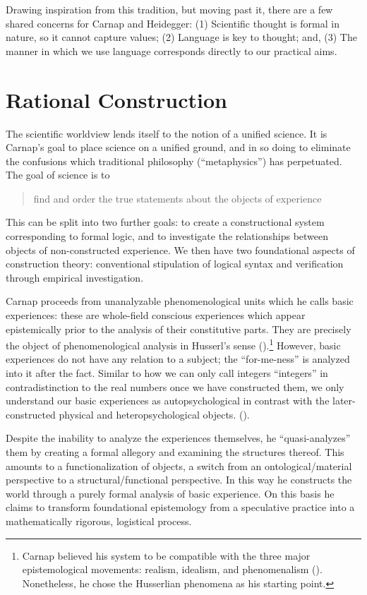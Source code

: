 \documentclass[leqno, 12pt]{turabian-researchpaper}
\begin{document}
	Drawing inspiration from this tradition, but moving past it, there are a few shared
	concerns for Carnap and Heidegger: (1) Scientific thought is formal in nature,
	so it cannot capture values; (2) Language is key to thought; and, (3) The
	manner in which we use language corresponds directly to our practical aims.

	\section{Rational Construction}

	The scientific worldview lends itself to the notion of a unified science. It
	is Carnap's goal to place science on a unified ground, and in so doing to eliminate
	the confusions which traditional philosophy (\enquote{metaphysics}) has
	perpetuated. The goal of science is to \blockquote[{}]{find and order the true statements about the objects of experience}.
	This can be split into two further goals: to create a constructional system corresponding
	to formal logic, and to investigate the relationships between objects of non-constructed
	experience. We then have two foundational aspects of construction theory:
	conventional stipulation of logical syntax and verification through empirical
	investigation.

	Carnap proceeds from unanalyzable phenomenological units which he calls basic
	experiences: these are whole-field conscious experiences which appear epistemically
	prior to the analysis of their constitutive parts. They are precisely the
	object of phenomenological analysis in Husserl's sense ().\footnote{Carnap
	believed his system to be compatible with the three major epistemological
	movements: realism, idealism, and phenomenalism ().
	Nonetheless, he chose the Husserlian phenomena as his starting point.} However,
	basic experiences do not have any relation to a subject; the \enquote{for-me-ness}
	is analyzed into it after the fact. Similar to how we can only call integers \enquote{integers}
	in contradistinction to the real numbers once we have constructed them, we only
	understand our basic experiences as autopsychological in contrast with the later-constructed
	physical and heteropsychological objects. ().

	Despite the inability to analyze the experiences themselves, he \enquote{quasi-analyzes}
	them by creating a formal allegory and examining the structures thereof. This amounts
	to a functionalization of objects, a switch from an ontological/material
	perspective to a structural/functional perspective. In this way he constructs the
	world through a purely formal analysis of basic experience. On this basis he
	claims to transform foundational epistemology from a speculative practice into
	a mathematically rigorous, logistical process.
\end{document}
